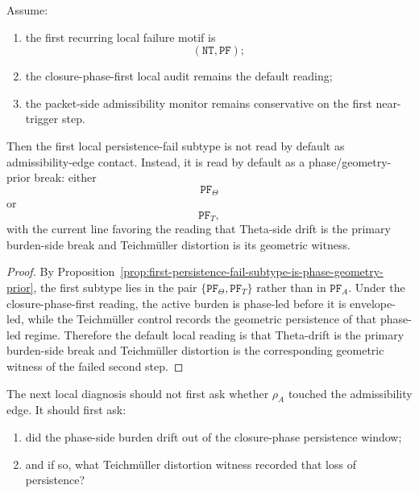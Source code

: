 \begin{theorem}
\label{thm:first-local-persistence-fail-subtype-theorem}
Assume:
\begin{enumerate}
    \item the first recurring local failure motif is
    \[
    (\mathtt{NT},\mathtt{PF});
    \]
    \item the closure-phase-first local audit remains the default reading;
    \item the packet-side admissibility monitor remains conservative on the first near-trigger step.
\end{enumerate}
Then the first local persistence-fail subtype is not read by default as admissibility-edge contact.
Instead, it is read by default as a phase/geometry-prior break:
either
\[
\mathtt{PF}_{\Theta}
\]
or
\[
\mathtt{PF}_{T},
\]
with the current line favoring the reading that Theta-side drift is the primary burden-side break and Teichm\"uller distortion is its geometric witness.
\end{theorem}

\begin{proof}
By Proposition~\ref{prop:first-persistence-fail-subtype-is-phase-geometry-prior}, the first subtype lies in the pair \(\{\mathtt{PF}_{\Theta},\mathtt{PF}_{T}\}\) rather than in \(\mathtt{PF}_{A}\).
Under the closure-phase-first reading, the active burden is phase-led before it is envelope-led, while the Teichm\"uller control records the geometric persistence of that phase-led regime.
Therefore the default local reading is that Theta-drift is the primary burden-side break and Teichm\"uller distortion is the corresponding geometric witness of the failed second step.
\end{proof}

\begin{corollary}
\label{cor:current-post-r18-local-diagnosis-rule}
The next local diagnosis should not first ask whether \(\rho_A\) touched the admissibility edge.
It should first ask:
\begin{enumerate}
    \item did the phase-side burden drift out of the closure-phase persistence window;
    \item and if so, what Teichm\"uller distortion witness recorded that loss of persistence?
\end{enumerate}
\end{corollary}

